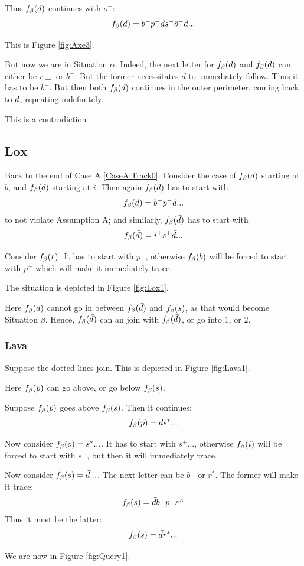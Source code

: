 Thus $f_\beta(d)$ continues with $o^-$:
\[
f_\beta(d) = b^- p^- d s^- \hat{o}^- \bar{d}...
\]

This is Figure \ref{fig:Axe3}.

But now we are in Situation $\alpha$. Indeed, the next letter for $f_\beta(d)$ and $f_\beta(\bar{d})$ can either be $r\pm$ or $b^-$. But the former necessitates $d$ to immediately follow. Thus it has to be $b^-$. But then both $f_\beta(d)$ continues in the outer perimeter, coming back to $\bar{d}$, repeating indefinitely.

This is a contradiction

\subsection{Lox} \label{Lox}
Back to the end of Case A \ref{CaseA:Track0}. Consider the case of $f_\beta(d)$ starting at $b$, and $f_\beta(\bar{d})$ starting at $i$. Then again $f_\beta(d)$ has to start with
\[
f_\beta(d) = b^- p^- d...
\]
to not violate Assumption A; and similarly, $f_\beta(\bar{d})$ has to start with
\[
f_\beta(\bar{d}) = i^+ s^+ \bar{d}...
\]

Consider $f_\beta(r)$. It has to start with $p^-$, otherwise $f_\beta(b)$ will be forced to start with $p^+$ which will make it immediately trace.

The situation is depicted in Figure \ref{fig:Lox1}.

Here $f_\beta(d)$ cannot go in between $f_\beta(\bar{d})$ and $f_\beta(s)$, as that would become Situation $\beta$. Hence, $f_\beta(\bar{d})$ can an join with $f_\beta(\bar{d})$, or go into 1, or 2.

\subsubsection{Lava} \label{Lava}
Suppose the dotted lines join. This is depicted in Figure \ref{fig:Lava1}.

Here $f_\beta(p)$ can go above, or go below $f_\beta(s)$.

 \label{Query}
Suppose $f_\beta(p)$ goes above $f_\beta(s)$. Then it continues:
\[
f_\beta(p) = d s^*...
\]

Now consider $f_\beta(o) = s^*...$. It has to start with $s^+...$, otherwise $f_\beta(i)$ will be forced to start with $s^-$, but then it will immediately trace. 

Now consider $f_\beta(s) = \bar{d}...$. The next letter can be $b^-$ or $r^*$. The former will make it trace:
\[
f_\beta(s) = \bar{d} b^- p^- s^\times
\]
Thus it must be the latter:
\[
f_\beta(s) = \bar{d} r^*...
\]

We are now in Figure \ref{fig:Query1}.


